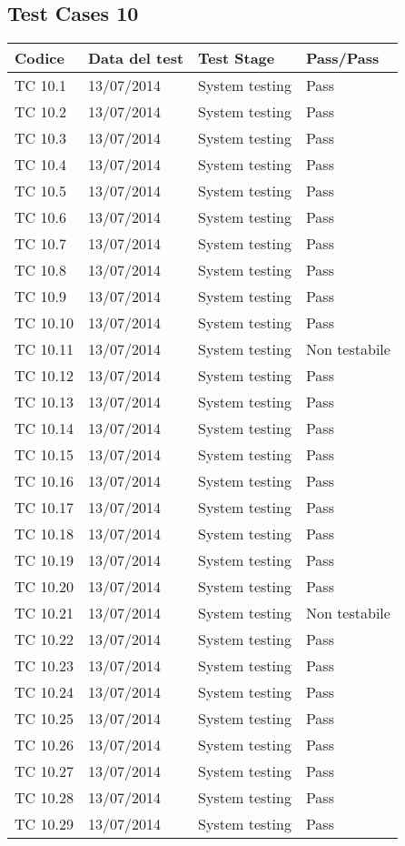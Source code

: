 \subsection{Test Cases 10}

\begin{longtable}{|p{3cm}|p{3cm}|p{3cm}|p{3cm}|}
	\hline
	\rowcolor{Gray}
	\textbf{Codice} & \textbf{Data del test} & \textbf{Test Stage} & \textbf{Pass/Pass}\tabularnewline
	\hline
	TC 10.1			& 13/07/2014 			& System testing		& Pass \tabularnewline
	\hline
	TC 10.2			& 13/07/2014 			& System testing		& Pass \tabularnewline
	\hline
	TC 10.3			& 13/07/2014 			& System testing		& Pass \tabularnewline
	\hline
	TC 10.4			& 13/07/2014 			& System testing		& Pass \tabularnewline
	\hline
	TC 10.5			& 13/07/2014 			& System testing		& Pass \tabularnewline
	\hline
	TC 10.6			& 13/07/2014 			& System testing		& Pass \tabularnewline
	\hline
	TC 10.7			& 13/07/2014 			& System testing		& Pass \tabularnewline
	\hline
	TC 10.8			& 13/07/2014 			& System testing		& Pass \tabularnewline
	\hline
	TC 10.9			& 13/07/2014 			& System testing		& Pass \tabularnewline
	\hline
	TC 10.10		& 13/07/2014 			& System testing		& Pass \tabularnewline
	\hline
	TC 10.11		& 13/07/2014 			& System testing		& Non testabile \tabularnewline
	\hline
	TC 10.12		& 13/07/2014 			& System testing		& Pass \tabularnewline
	\hline
	TC 10.13		& 13/07/2014 			& System testing		& Pass \tabularnewline
	\hline
	TC 10.14		& 13/07/2014 			& System testing		& Pass \tabularnewline
	\hline
	TC 10.15		& 13/07/2014 			& System testing		& Pass \tabularnewline
	\hline
	TC 10.16		& 13/07/2014 			& System testing		& Pass \tabularnewline
	\hline
	TC 10.17		& 13/07/2014 			& System testing		& Pass \tabularnewline
	\hline
	TC 10.18		& 13/07/2014 			& System testing		& Pass \tabularnewline
	\hline
	TC 10.19		& 13/07/2014 			& System testing		& Pass \tabularnewline
	\hline
	TC 10.20		& 13/07/2014 			& System testing		& Pass \tabularnewline
	\hline
	TC 10.21		& 13/07/2014 			& System testing		& Non testabile \tabularnewline
	\hline
	TC 10.22		& 13/07/2014 			& System testing		& Pass \tabularnewline
	\hline
	TC 10.23		& 13/07/2014 			& System testing		& Pass \tabularnewline
	\hline
	TC 10.24		& 13/07/2014 			& System testing		& Pass \tabularnewline
	\hline
	TC 10.25		& 13/07/2014 			& System testing		& Pass \tabularnewline
	\hline
	TC 10.26		& 13/07/2014 			& System testing		& Pass \tabularnewline
	\hline
	TC 10.27		& 13/07/2014 			& System testing		& Pass \tabularnewline
	\hline
	TC 10.28		& 13/07/2014 			& System testing		& Pass \tabularnewline
	\hline
	TC 10.29		& 13/07/2014 			& System testing		& Pass \tabularnewline

\end{longtable}
